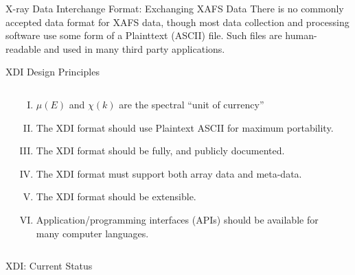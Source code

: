 \documentclass[final]{beamer}
\begin{document}
\begin{frame}{}
\begin{columns}[t]
\begin{column}{.54\linewidth}
\begin{block}{\large  X-ray Data Interchange Format:  Exchanging
            XAFS Data}
          There is no commonly accepted data format for XAFS data, though
          most data collection and processing software use some form of a
          Plainttext (ASCII) file.  Such files are human-readable and used
          in many third party applications.

        \end{block}

        \begin{block}{\large XDI Design Principles}

          \begin{columns}[T]
            \begin{column}{0.05\linewidth}    \end{column}
            \begin{column}{0.90\linewidth}

              \begin{enumerate}[I.] \normalsize
              \item $\mu(E)$ and $\chi(k)$ are the spectral ``unit of  currency''
              \item The XDI format should use Plaintext ASCII for maximum portability.
              \item The XDI format should be fully, and publicly documented.
              \item The XDI format must support both array data and meta-data.
              \item The XDI format should be extensible.
              \item Application/programming interfaces (APIs) should be
                available for many computer languages.
              \end{enumerate}

            \end{column}
            \begin{column}{0.05\linewidth}    \end{column}
          \end{columns}
        \end{block}

        \begin{block}{\large XDI: Current Status}


\end{block}
\end{column}
\end{columns}
\end{frame}
\end{document}
